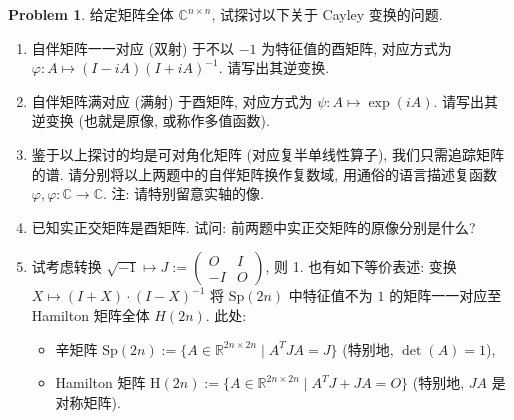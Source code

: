 \documentclass{MainStyle}
\theoremstyle{definition}
\newtheorem{problem}{Problem}
\begin{document}
\begin{problem}
给定矩阵全体 $\mathbb C^{n\times n}$, 试探讨以下关于 Cayley 变换的问题.
\begin{enumerate}
    \item 自伴矩阵一一对应 (双射) 于不以 $-1$ 为特征值的酉矩阵, 对应方式为 $\varphi:A\mapsto (I-iA)(I+iA)^{-1}$. 请写出其逆变换.
    \item 自伴矩阵满对应 (满射) 于酉矩阵, 对应方式为 $\psi: A\mapsto \exp (iA)$. 请写出其逆变换 (也就是原像, 或称作多值函数).
    \item 鉴于以上探讨的均是可对角化矩阵 (对应复半单线性算子), 我们只需追踪矩阵的谱. 请分别将以上两题中的自伴矩阵换作复数域, 用通俗的语言描述复函数 $\varphi,\varphi:\mathbb C\to \mathbb C$. 注: 请特别留意实轴的像.
    \item 已知实正交矩阵是酉矩阵. 试问: 前两题中实正交矩阵的原像分别是什么?
    \item 试考虑转换 $\sqrt{-1}\mapsto  J:=\begin{pmatrix}O&I\\-I&O\end{pmatrix}$, 则 1. 也有如下等价表述: 变换 $X\mapsto (I+X)\cdot (I-X)^{-1}$ 将 $\mathrm{Sp}(2n)$ 中特征值不为 $1$ 的矩阵一一对应至 Hamilton 矩阵全体 $H(2n)$. 此处:
          \begin{itemize}
              \item 辛矩阵 $\mathrm{Sp}(2n):=\{A\in \mathbb R^{2n\times 2n}\mid A^TJA=J\}$ (特别地, $\det (A)=1$),
              \item Hamilton 矩阵 $\mathrm{H}(2n):=\{A\in \mathbb R^{2n\times 2n}\mid A^TJ+JA=O\}$ (特别地, $JA$ 是对称矩阵).
          \end{itemize}
\end{enumerate}
\end{problem}
\end{document}
